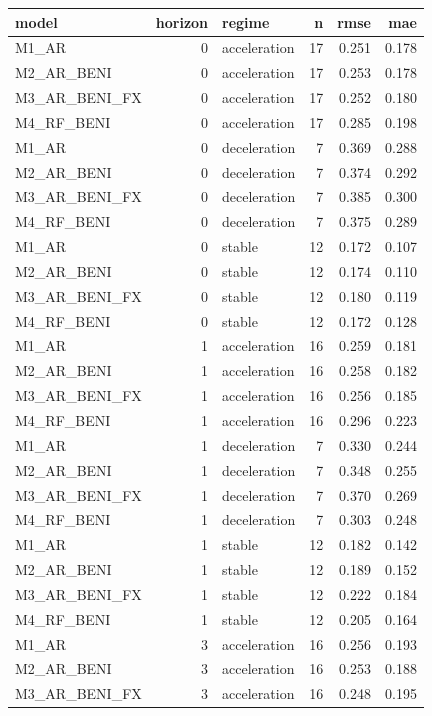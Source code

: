 \begin{tabular}{lrlrrr}
\toprule
model & horizon & regime & n & rmse & mae \\
\midrule
M1\_AR & 0 & acceleration & 17 & 0.251 & 0.178 \\
M2\_AR\_BENI & 0 & acceleration & 17 & 0.253 & 0.178 \\
M3\_AR\_BENI\_FX & 0 & acceleration & 17 & 0.252 & 0.180 \\
M4\_RF\_BENI & 0 & acceleration & 17 & 0.285 & 0.198 \\
M1\_AR & 0 & deceleration & 7 & 0.369 & 0.288 \\
M2\_AR\_BENI & 0 & deceleration & 7 & 0.374 & 0.292 \\
M3\_AR\_BENI\_FX & 0 & deceleration & 7 & 0.385 & 0.300 \\
M4\_RF\_BENI & 0 & deceleration & 7 & 0.375 & 0.289 \\
M1\_AR & 0 & stable & 12 & 0.172 & 0.107 \\
M2\_AR\_BENI & 0 & stable & 12 & 0.174 & 0.110 \\
M3\_AR\_BENI\_FX & 0 & stable & 12 & 0.180 & 0.119 \\
M4\_RF\_BENI & 0 & stable & 12 & 0.172 & 0.128 \\
M1\_AR & 1 & acceleration & 16 & 0.259 & 0.181 \\
M2\_AR\_BENI & 1 & acceleration & 16 & 0.258 & 0.182 \\
M3\_AR\_BENI\_FX & 1 & acceleration & 16 & 0.256 & 0.185 \\
M4\_RF\_BENI & 1 & acceleration & 16 & 0.296 & 0.223 \\
M1\_AR & 1 & deceleration & 7 & 0.330 & 0.244 \\
M2\_AR\_BENI & 1 & deceleration & 7 & 0.348 & 0.255 \\
M3\_AR\_BENI\_FX & 1 & deceleration & 7 & 0.370 & 0.269 \\
M4\_RF\_BENI & 1 & deceleration & 7 & 0.303 & 0.248 \\
M1\_AR & 1 & stable & 12 & 0.182 & 0.142 \\
M2\_AR\_BENI & 1 & stable & 12 & 0.189 & 0.152 \\
M3\_AR\_BENI\_FX & 1 & stable & 12 & 0.222 & 0.184 \\
M4\_RF\_BENI & 1 & stable & 12 & 0.205 & 0.164 \\
M1\_AR & 3 & acceleration & 16 & 0.256 & 0.193 \\
M2\_AR\_BENI & 3 & acceleration & 16 & 0.253 & 0.188 \\
M3\_AR\_BENI\_FX & 3 & acceleration & 16 & 0.248 & 0.195 \\

\end{tabular}
